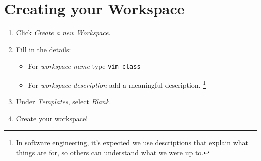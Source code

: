 \documentclass{article}
\begin{document}
\section*{Creating your Workspace}
\begin{enumerate}
    \item Click \textit{Create a new Workspace}.
    \item Fill in the details:
        \begin{itemize}
            \item For \textit{workspace name} type \texttt{vim-class}
            \item For \textit{workspace description} add a meaningful description.
                \footnote{
                    In software engineering, it's expected we use
                    descriptions that explain what things are for, so others can
                    understand what we were up to.
                }
        \end{itemize}

    \item Under \textit{Templates}, select \textit{Blank}.
    \item Create your workspace!
\end{enumerate}
\end{document}
